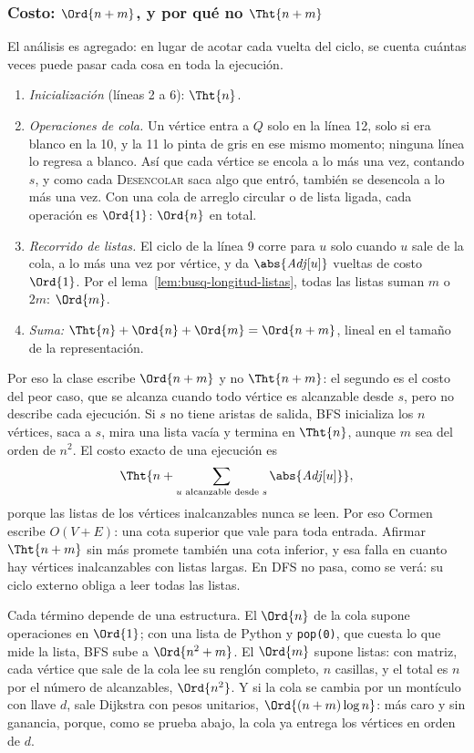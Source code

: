 \documentclass[11pt,letterpaper]{article}
\begin{document}
\subsubsection*{Costo: $\Ord{n + m}$, y por qué no $\Tht{n + m}$}

El análisis es agregado: en lugar de acotar cada vuelta del ciclo, se
cuenta cuántas veces puede pasar cada cosa en toda la ejecución.
\begin{enumerate}[itemsep=0.15em]
  \item \textit{Inicialización} (líneas 2 a 6): $\Tht{n}$.
  \item \textit{Operaciones de cola.} Un vértice entra a $Q$ solo en
    la línea 12, solo si era blanco en la 10, y la 11 lo pinta de gris
    en ese mismo momento; ninguna línea lo regresa a blanco. Así que
    cada vértice se encola a lo más una vez, contando $s$, y como cada
    \textsc{Desencolar} saca algo que entró, también se desencola a lo
    más una vez. Con una cola de arreglo circular o de lista ligada,
    cada operación es $\Ord{1}$: $\Ord{n}$ en total.
  \item \textit{Recorrido de listas.} El ciclo de la línea 9 corre
    para $u$ solo cuando $u$ sale de la cola, a lo más una vez por
    vértice, y da $\abs{\mathit{Adj}[u]}$ vueltas de costo $\Ord{1}$.
    Por el lema~\ref{lem:busq-longitud-listas}, todas las listas
    suman $m$ o $2m$: $\Ord{m}$.
  \item \textit{Suma:} $\Tht{n} + \Ord{n} + \Ord{m} = \Ord{n + m}$,
    lineal en el tamaño de la representación.
\end{enumerate}

Por eso la clase escribe $\Ord{n + m}$ y no $\Tht{n + m}$: el
segundo es el costo del peor caso, que se alcanza cuando todo vértice
es alcanzable desde $s$, pero no describe cada ejecución. Si $s$ no
tiene aristas de salida, BFS inicializa los $n$ vértices, saca a
$s$, mira una lista vacía y termina en $\Tht{n}$, aunque $m$ sea del
orden de $n^2$. El costo exacto de una ejecución es
\[
  \Tht{n + \sum_{u \text{ alcanzable desde } s}
               \abs{\mathit{Adj}[u]}} ,
\]
porque las listas de los vértices inalcanzables nunca se leen. Por eso
Cormen escribe $O(V + E)$: una cota superior que vale para toda
entrada. Afirmar $\Tht{n + m}$ sin más promete también una cota
inferior, y esa falla en cuanto hay vértices inalcanzables con listas
largas. En DFS no pasa, como se verá: su ciclo externo obliga a leer
todas las listas.

Cada término depende de una estructura. El $\Ord{n}$ de la cola supone
operaciones en $\Ord{1}$; con una lista de Python y \texttt{pop(0)},
que cuesta lo que mide la lista, BFS sube a $\Ord{n^2 + m}$. El
$\Ord{m}$ supone listas: con matriz, cada vértice que sale de la cola
lee su renglón completo, $n$ casillas, y el total es $n$ por el número
de alcanzables, $\Ord{n^2}$. Y si la cola se
cambia por un montículo con llave $d$, sale Dijkstra con pesos
unitarios, $\Ord{(n + m) \log n}$: más caro y sin ganancia, porque,
como se prueba abajo, la cola ya entrega los vértices en orden de $d$.
\end{document}
